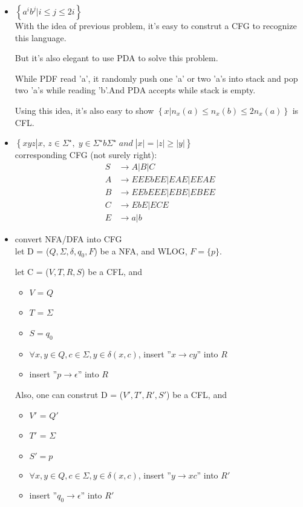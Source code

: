 \documentclass{article}
\begin{document}
\begin{itemize}
        \item $\left\{ a^ib^j | i \leq j \leq 2i \right\}$ \\ 
            With the idea of previous problem, it's easy to construt a CFG to recognize this language.

            But it's also elegant to use PDA to solve this problem. 
            
            While PDF read 'a', it randomly push one 'a' or two 'a's into stack and pop two 'a's while reading 'b'.And PDA accepts while stack is empty.
            
            Using this idea, it's also easy to show $\left\{ x | n_{x}(a) \leq n_{x}(b) \leq 2n_{x}(a) \right\}$ is CFL.

        \item $\left\{xyz|x,\,z\in \Sigma^\star ,\; y\in \Sigma^\star b \Sigma^\star \; and \; |x|=|z|\geq |y|\right\}$ \\ corresponding CFG (not surely right):
            \begin{align*}
                S & \rightarrow A|B|C\\
                A & \rightarrow EEEbEE | EAE | EEAE \\ 
                B & \rightarrow EEbEEE | EBE | EBEE \\
                C & \rightarrow EbE | ECE\\
                E & \rightarrow a|b
            \end{align*}
        \item convert NFA/DFA into CFG \\
            let D = ($Q, \Sigma, \delta, q_{0}, F$) be a NFA, and WLOG, $F = \{p\}$.
            
            let C = ($V, T, R, S$) be a CFL, and
            \begin{itemize}
                \item $V$ = $Q$ 
                \item  $T$ = $\Sigma$ 
                \item $S = q_{0}$
                \item $\forall x, y \in Q, c \in \Sigma, y\in \delta(x, c)$, insert ''$x \rightarrow cy$'' into $R$ 
                \item insert ''$p \rightarrow \epsilon$'' into $R$
            \end{itemize}

            Also, one can construt D = ($V', T', R', S'$) be a CFL, and
            \begin{itemize}
                \item $V'$ = $Q'$ 
                \item  $T'$ = $\Sigma$ 
                \item $S' = p$
                \item $\forall x, y \in Q, c \in \Sigma, y\in \delta(x, c)$, insert ''$y \rightarrow xc$'' into $R'$ 
                \item insert ''$q_{0} \rightarrow \epsilon$'' into $R'$
            \end{itemize}


\end{itemize}
\end{document}
